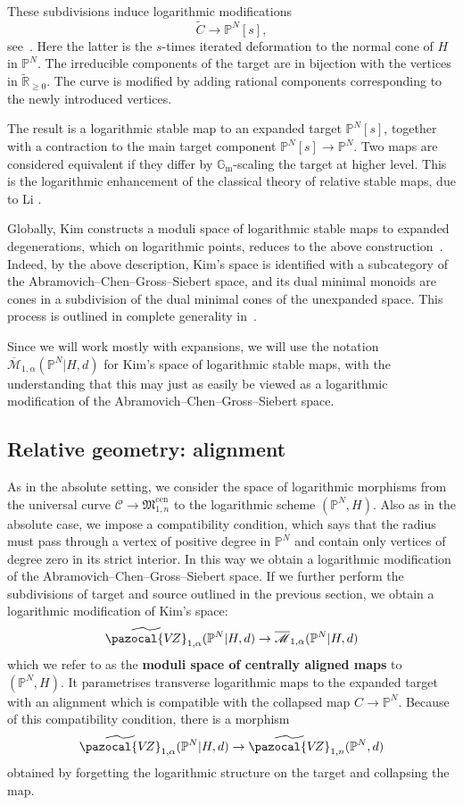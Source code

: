 \documentclass[11pt]{amsart}
\newcommand{\PP}{\mathbb P}
\newcommand{\VZ}{\pazocal{V\!Z}}
\renewcommand{\to}{\rightarrow}
\newcommand{\Gm}{\mathbb{G}_{\text{m}}}
\newcommand{\Mcal}{\mathcal{M}}
\newcommand{\ol}[1]{\overline{#1}}
\theoremstyle{definition}
\theoremstyle{definition}
\begin{document}
These subdivisions induce logarithmic modifications
\[
\widetilde C\to \mathbb P^N[s],
\]
see~\cite{AW}. Here the latter is the $s$-times iterated deformation to the normal cone of $H$ in $\mathbb P^N$. The irreducible components of the target are in bijection with the vertices in $\widetilde{\mathbb R}_{\geq 0}$. The curve is modified by adding rational components corresponding to the newly introduced vertices.

The result is a logarithmic stable map to an expanded target $\mathbb P^N[s]$, together with a contraction to the main target component $\mathbb P^N[s]\to\mathbb P^N$. Two maps are considered equivalent if they differ by $\Gm$-scaling the target at higher level. This is the logarithmic enhancement of the classical theory of relative stable maps, due to Li \cite{Li1,Li2}.

Globally, Kim constructs a moduli space of logarithmic stable maps to expanded degenerations, which on logarithmic points, reduces to the above construction~\cite{KimLog}. Indeed, by the above description, Kim's space is identified with a subcategory of the Abramovich--Chen--Gross--Siebert space, and its dual minimal monoids are cones in a subdivision of the dual minimal cones of the unexpanded space. This process is outlined in complete generality in~\cite[\S~2]{R19}. 

Since we will work mostly with expansions, we will use the notation
$\ol\Mcal_{1,\alpha}(\PP^N|H,d)$
for Kim's space of logarithmic stable maps, with the understanding that this may just as easily be viewed as a logarithmic modification of the Abramovich--Chen--Gross--Siebert space.

\subsection{Relative geometry: alignment} As in the absolute setting, we consider the space of logarithmic morphisms from the universal curve $\mathcal{C} \to \mathfrak{M}_{1,n}^{\mathrm{cen}}$ to the logarithmic scheme $(\PP^N,H)$. Also as in the absolute case, we impose a compatibility condition, which says that the radius must pass through a vertex of positive degree in $\PP^N$ and contain only vertices of degree zero in its strict interior. In this way we obtain a logarithmic modification of the Abramovich--Chen--Gross--Siebert space. If we further perform the subdivisions of target and source outlined in the previous section, we obtain a logarithmic modification of Kim's space:
\begin{equation*} \widetilde\VZ_{1,\alpha}(\PP^N|H,d) \to \ol\Mcal_{1,\alpha}(\PP^N|H,d)\end{equation*}
which we refer to as the \textbf{moduli space of centrally aligned maps} to $(\PP^N,H)$. It parametrises transverse logarithmic maps to the expanded target with an alignment which is compatible with the collapsed map $C \to \PP^N$. Because of this compatibility condition, there is a morphism
\begin{equation*} \widetilde\VZ_{1,\alpha}(\PP^N|H,d) \to \widetilde\VZ_{1,n}(\PP^N,d)\end{equation*}
obtained by forgetting the logarithmic structure on the target and collapsing the map.
\end{document}
